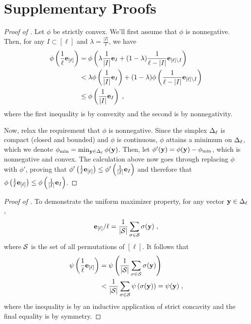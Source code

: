 \section{Supplementary Proofs} \label{sec:supplementary-proofs}

\begin{proof}[Proof of ]
    Let $\phi$ be strictly convex. 
    We'll first assume that $\phi$ is nonnegative. 
    Then, for any $I \subset [\ell]$ and $\lambda = \frac{|I|}{\ell}$, we have
    \begin{align*}
      \phi\left( \frac{1}{\ell} \mathbf{e}_{[\ell]}  \right) 
      & = \phi\left( \lambda \frac{1}{|I|} \mathbf{e}_{I} + (1-\lambda) \frac{1}{\ell - |I|} \mathbf{e}_{[\ell]\setminus I} \right) \\
      & < \lambda \phi\left( \frac{1}{|I|} \mathbf{e}_{I} \right) + (1-\lambda) \phi\left( \frac{1}{\ell - |I|} \mathbf{e}_{[\ell]\setminus I} \right) \\
      & \leq \phi\left( \frac{1}{|I|} \mathbf{e}_{I} \right) \;,
    \end{align*}
    where the first inequality is by convexity and the second is by nonnegativity. 

    Now, relax the requirement that $\phi$ is nonnegative. 
    Since the simplex $\Delta_{\ell}$ is compact (closed and bounded) and $\phi$ is continuous, $\phi$ attains a minimum on $\Delta_{\ell}$, which we denote $\phi_{\min} = \min_{\mathbf{y} \in \Delta_{\ell}} \phi(\mathbf{y})$.
    Then, let $\phi'(\mathbf{y}) = \phi(\mathbf{y}) - \phi_{\min}$, which is nonnegative and convex. 
    The calculation above now goes through replacing $\phi$ with $\phi'$, proving that $\phi'\left( \frac{1}{\ell} \mathbf{e}_{[\ell]} \right) \leq \phi'\left( \frac{1}{|I|} \mathbf{e}_{I} \right)$  and therefore that $\phi\left( \frac{1}{\ell} \mathbf{e}_{[\ell]} \right) \leq \phi\left( \frac{1}{|I|} \mathbf{e}_{I} \right)$.
  \end{proof}

\begin{proof}[Proof of ]
      To demonstrate the uniform maximizer property, for any vector $\mathbf{y} \in \Delta_{\ell}$,
      \begin{align*}
        \mathbf{e}_{[\ell]}/\ell = \frac{1}{\left| \mathcal{S} \right|}\sum_{\sigma \in \mathcal{S}} \sigma(\mathbf{y}) \;,
      \end{align*}
      where $\mathcal{S}$ is the set of all permutations of $[\ell]$.
      It follows that 
      \begin{align*}
        \psi\left( \frac{1}{\ell} \mathbf{e}_{[\ell]} \right) 
        & = \psi\left( \frac{1}{\left| \mathcal{S} \right|}\sum_{\sigma \in \mathcal{S}} \sigma(\mathbf{y}) \right) \\
        & < \frac{1}{\left| \mathcal{S} \right|}\sum_{\sigma \in \mathcal{S}} \psi\left( \sigma(\mathbf{y}) \right) = \psi(\mathbf{y}) \;,
      \end{align*}
      where the inequality is by an inductive application of strict concavity and the final equality is by symmetry.
  \end{proof}


